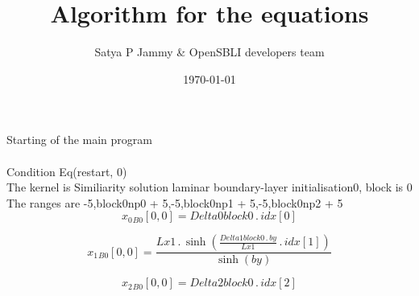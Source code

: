 \documentclass{article}
\title{Algorithm for the equations}
\author{Satya P Jammy \& OpenSBLI developers team}
\date{\today}
\begin{document}
\maketitle
\noindent Starting of the main program\\
\\\noindent Condition Eq(restart, 0)\\\noindent The kernel is Similiarity solution laminar boundary-layer initialisation0, block is 0\\\noindent The ranges are -5,block0np0 + 5,-5,block0np1 + 5,-5,block0np2 + 5\\\begin{dmath}{x_{0}{_{B0}}}[{0,0}] = Delta0block0 \,.\, {idx}[{0}]\end{dmath}

\begin{dmath}{x_{1}{_{B0}}}[{0,0}] = \frac{Lx1 \,.\, \sinh{\left (\frac{Delta1block0 \,.\, by}{Lx1} \,.\, {idx}[{1}] \right )}}{\sinh{\left (by \right )}}\end{dmath}

\begin{dmath}{x_{2}{_{B0}}}[{0,0}] = Delta2block0 \,.\, {idx}[{2}]\end{dmath}
\end{document}
